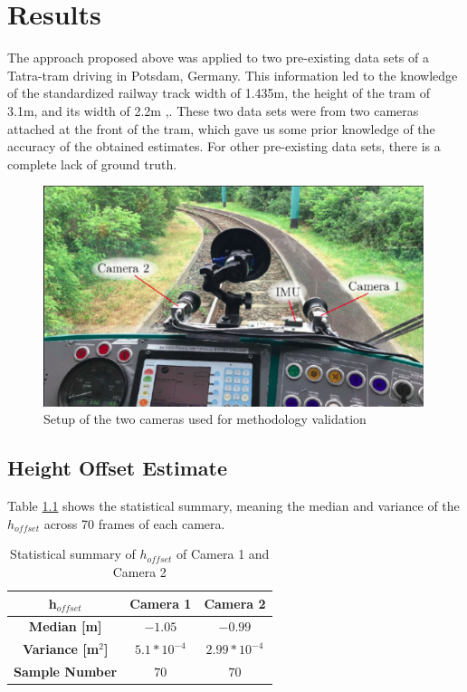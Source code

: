 \chapter{Results}

The approach proposed above was applied to two pre-existing data sets of a Tatra-tram driving in Potsdam, Germany. This information led to the knowledge of the standardized railway track width of 1.435m, the height of the tram of 3.1m, and its width of 2.2m \citep{strassmichael},\citep{tram2000}. These two data sets were from two cameras attached at the front of the tram, which gave us some prior knowledge of the accuracy of the obtained estimates. For other pre-existing data sets, there is a complete lack of ground truth.

\begin{figure}[h!]
   \centering
   \includegraphics[width=0.99\textwidth]{images/camera_setup.png}
   \caption{Setup of the two cameras used for methodology validation}
   \label{pics:setup}
\end{figure}
\newpage




\section{Height Offset Estimate}
Table \ref{tab:stats_h_offset} shows the statistical summary, meaning the median and variance of the $h_{offset}$ across 70 frames of each camera. \\
\begin{table}[h!]
\centering
\begin{tabular}{c c c}
\textbf{h$_{offset}$}  & \textbf{Camera 1} & \textbf{Camera 2} \\
\midrule
\textbf{Median [m]} & $-1.05$ & $-0.99 $ \\
\textbf{Variance [m$^2$]} & $5.1 * 10^{-4}$ & $2.99 * 10^{-4} $ \\
\textbf{Sample Number} & $70$ & $70$ \\
\bottomrule
\end{tabular}
\caption{Statistical summary of $h_{offset}$ of Camera 1 and Camera 2}
\label{tab:stats_h_offset}
\end{table}

